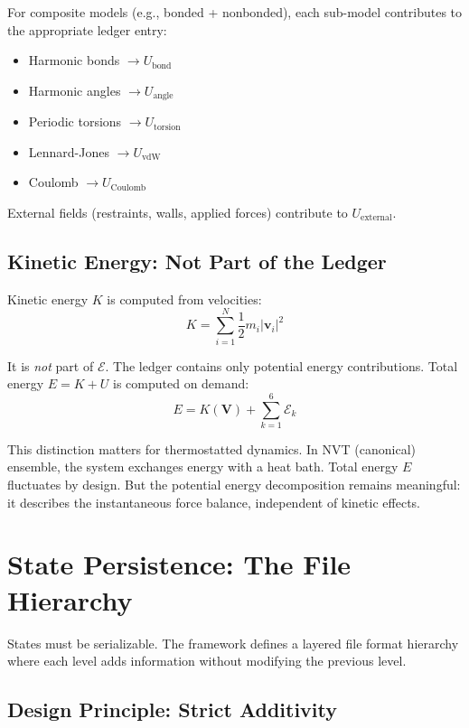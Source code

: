 \documentclass[11pt]{article}
\begin{document}
For composite models (e.g., bonded + nonbonded), each sub-model contributes to the appropriate ledger entry:
\begin{itemize}
\item Harmonic bonds $\to U_{\text{bond}}$
\item Harmonic angles $\to U_{\text{angle}}$
\item Periodic torsions $\to U_{\text{torsion}}$
\item Lennard-Jones $\to U_{\text{vdW}}$
\item Coulomb $\to U_{\text{Coulomb}}$
\end{itemize}

External fields (restraints, walls, applied forces) contribute to $U_{\text{external}}$.

\subsection{Kinetic Energy: Not Part of the Ledger}

Kinetic energy $K$ is computed from velocities:
\begin{equation}
K = \sum_{i=1}^{N} \frac{1}{2} m_i |\mathbf{v}_i|^2
\end{equation}

It is \textit{not} part of $\mathcal{E}$. The ledger contains only potential energy contributions. Total energy $E = K + U$ is computed on demand:
\begin{equation}
E = K(\mathbf{V}) + \sum_{k=1}^{6} \mathcal{E}_k
\end{equation}

This distinction matters for thermostatted dynamics. In NVT (canonical) ensemble, the system exchanges energy with a heat bath. Total energy $E$ fluctuates by design. But the potential energy decomposition remains meaningful: it describes the instantaneous force balance, independent of kinetic effects.

\section{State Persistence: The File Hierarchy}

States must be serializable. The framework defines a layered file format hierarchy where each level adds information without modifying the previous level.

\subsection{Design Principle: Strict Additivity}
\end{document}

